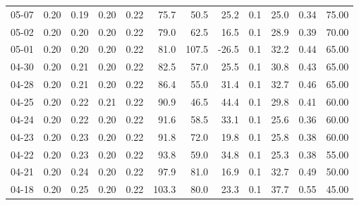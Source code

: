 \begin{threeparttable}
{\begin{tabular}{lrrrrrrrrrrr}
  05-07 &          0.20 &          0.19 &          0.20 &        0.22 &                75.7 &                50.5 &       25.2 &                 0.1 &             25.0 &            0.34 &                  75.00 \\
  05-02 &          0.20 &          0.20 &          0.20 &        0.22 &                79.0 &                62.5 &       16.5 &                 0.1 &             28.9 &            0.39 &                  70.00 \\
  05-01 &          0.20 &          0.20 &          0.20 &        0.22 &                81.0 &               107.5 &      -26.5 &                 0.1 &             32.2 &            0.44 &                  65.00 \\
  04-30 &          0.20 &          0.21 &          0.20 &        0.22 &                82.5 &                57.0 &       25.5 &                 0.1 &             30.8 &            0.43 &                  65.00 \\
  04-28 &          0.20 &          0.21 &          0.20 &        0.22 &                86.4 &                55.0 &       31.4 &                 0.1 &             32.7 &            0.46 &                  65.00 \\
  04-25 &          0.20 &          0.22 &          0.21 &        0.22 &                90.9 &                46.5 &       44.4 &                 0.1 &             29.8 &            0.41 &                  60.00 \\
  04-24 &          0.20 &          0.22 &          0.20 &        0.22 &                91.6 &                58.5 &       33.1 &                 0.1 &             25.6 &            0.36 &                  60.00 \\
  04-23 &          0.20 &          0.23 &          0.20 &        0.22 &                91.8 &                72.0 &       19.8 &                 0.1 &             25.8 &            0.38 &                  60.00 \\
  04-22 &          0.20 &          0.23 &          0.20 &        0.22 &                93.8 &                59.0 &       34.8 &                 0.1 &             25.3 &            0.38 &                  55.00 \\
  04-21 &          0.20 &          0.24 &          0.20 &        0.22 &                97.9 &                81.0 &       16.9 &                 0.1 &             32.7 &            0.49 &                  50.00 \\
  04-18 &          0.20 &          0.25 &          0.20 &        0.22 &               103.3 &                80.0 &       23.3 &                 0.1 &             37.7 &            0.55 &                  45.00 \\

\end{tabular}}
\end{threeparttable}
